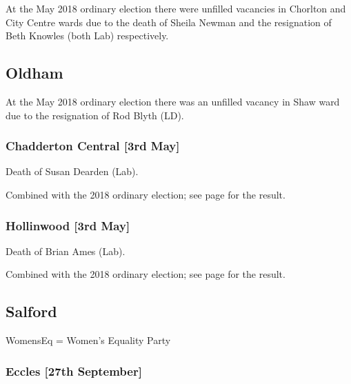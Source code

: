 \documentclass[a4paper,openany]{book}
\begin{document}
\begin{resultsiii}
At the May 2018 ordinary election there were unfilled vacancies in Chorlton and City Centre wards due to the death of Sheila Newman and the resignation of Beth Knowles (both Lab) respectively.

\subsection*{Oldham}

At the May 2018 ordinary election there was an unfilled vacancy in Shaw ward due to the resignation of Rod Blyth (LD).

\subsubsection*{Chadderton Central \hspace*{\fill}\nolinebreak[1]%
\enspace\hspace*{\fill}
[3rd May]}


Death of Susan Dearden (Lab).

Combined with the 2018 ordinary election; see page \pageref{ChaddertonCentralOldham} for the result.

\subsubsection*{Hollinwood \hspace*{\fill}\nolinebreak[1]%
\enspace\hspace*{\fill}
[3rd May]}


Death of Brian Ames (Lab).

Combined with the 2018 ordinary election; see page \pageref{HollinwoodOldham} for the result.

\subsection*{Salford}

WomensEq = Women's Equality Party

\subsubsection*{Eccles \hspace*{\fill}\nolinebreak[1]%
\enspace\hspace*{\fill}
[27th September]}


\end{resultsiii}
\end{document}

